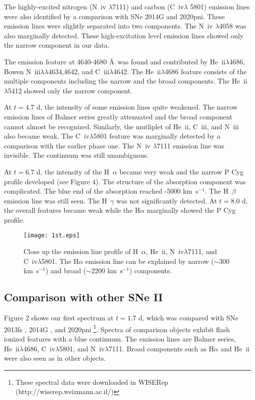 \documentclass{pasj01}
\begin{document}
  The highly-excited nitrogen (N~{\sc iv} $\lambda$7111) 
 and carbon (C~{\sc iv}$\lambda$ 5801) emission lines were also 
 identified by a comparison with SNe 2014G and 2020pni.
 These emission lines were slightly separated 
 into two components. The N~{\sc iv} $\lambda$4058 was also marginally detected. 
 These high-excitation level emission lines 
 showed only the narrow component in our data.

 The emission feature at 4640-4680 \AA\ was 
 found and contributed by He~{\sc ii}$\lambda$4686, Bowen N~{\sc iii}$\lambda\lambda$4634,4642, and C~{\sc iii}$\lambda$4642. 
 The He~{\sc ii}$\lambda$4686 feature consists of the multiple components including 
 the narrow and the broad components. 
 The He~{\sc ii}$\lambda$5412 showed only the narrow component. 

  At $t=4.7$ d, the intensity of some emission lines 
 quite weakened. The narrow emission lines of Balmer
 series greatly attenuated and the broad component cannot 
 almost be recognized. Similarly, the mutliplet 
 of He~{\sc ii}, C~{\sc iii}, and N~{\sc iii}
 also became weak. The C~{\sc iv}$\lambda$5801 feature was
 marginally detected by a comparison with 
 the earlier phase one. The N~{\sc iv} $\lambda$7111
 emission line was invisible. The continuum was still unambiguous. 

 At $t=6.7$ d, the intensity of the H~{$\alpha$} 
became very weak and the narrow P Cyg profile developed  (see Figure 4). 
The structure of the absorption component was complicated. The blue end 
of the absorption reached -5000 km~s$^{-1}$.
The H~{$\beta$} emission line was still seen. The H~{$\gamma$} was not 
significantly detected. At $t=8.0$ d, 
the overall features became weak while the 
H{$\alpha$} marginally showed the P Cyg profile.

\begin{figure}
 \begin{center}
  \texttt{[image: 1st.eps]}
 \end{center}
 \caption{Close up the emission line profile of H~{$\alpha$}, 
 He~{\sc ii}, N~{\sc iv}$\lambda$7111, and 
 C~{\sc iv}$\lambda$5801. The H$\alpha$ emission line can be explained 
 by narrow ($\sim300$ km~s$^{-1}$) and broad ($\sim$2200 km~s$^{-1}$) components.}
\end{figure}

 \subsection{Comparison with other SNe II}
 Figure 2 shows our first spectrum at $t=1.7$ d, which was 
compared with SNe 2013fs \citep{Yaron2017}, 2014G 
\citep{Terreran2016}, and 2020pni \citep{Terreran2022} 
\footnote{These spectral data were downloaded in WISERep (http://wiserep.weizmann.ac.il/)}.
Spectra of comparison objects exhibit flash ionized features
with a blue continuum. The emission lines are 
Balmer series, He~{\sc ii}$\lambda4686$, 
C~{\sc iv}$\lambda$5801, and N~{\sc iv}$\lambda$7111. 
Broad components such as H$\alpha$ and He~{\sc ii}
were also seen as in other objects.
\end{document}
